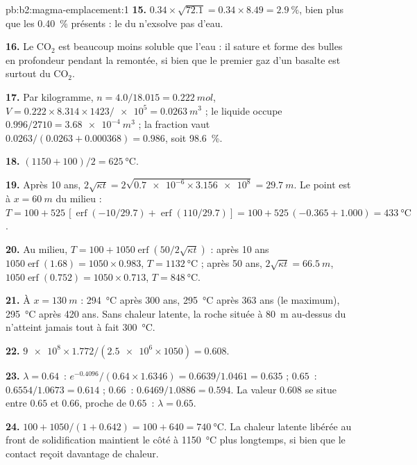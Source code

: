 \begin{solution}{pb:b2:magma-emplacement:1}
\textbf{15.} $0.34\times\sqrt{72.1} = 0.34\times8.49 = \qty{2.9}{\percent}$, bien plus que
les \qty{0.40}{\percent} présents : le  du  n'exsolve pas d'eau.

\textbf{16.} Le CO$_2$ est beaucoup moins soluble que l'eau : il sature et forme des bulles
en profondeur pendant la remontée, si bien que le premier gaz d'un basalte est surtout du CO$_2$.

\textbf{17.} Par kilogramme, $n = 4.0/18.015 = \qty{0.222}{mol}$, $V = 0.222\times8.314\times1423/
\num{e5} = \qty{0.0263}{m^3}$ ; le liquide occupe $0.996/2710 = \qty{3.68e-4}{m^3}$ ; la
fraction vaut $0.0263/(0.0263 + 0.000368) = 0.986$, soit \qty{98.6}{\percent}.

\textbf{18.} $(1150 + 100)/2 = \qty{625}{\celsius}$.

\textbf{19.} Après 10 ans, $2\sqrt{\kappa t} = 2\sqrt{\num{0.7e-6}\times\num{3.156e8}} =
\qty{29.7}{m}$. Le point est à $x = \qty{60}{m}$ du milieu : $T = 100 +
525\,[\operatorname{erf}(-10/29.7) + \operatorname{erf}(110/29.7)] = 100 + 525\,(-0.365 +
1.000) = \qty{433}{\celsius}$.

\textbf{20.} Au milieu, $T = 100 + 1050\operatorname{erf}(50/2\sqrt{\kappa t})$ : après
10 ans $1050\operatorname{erf}(1.68) = 1050\times0.983$, $T = \qty{1132}{\celsius}$ ; après
50 ans, $2\sqrt{\kappa t} = \qty{66.5}{m}$, $1050\operatorname{erf}(0.752) = 1050\times0.713$,
$T = \qty{848}{\celsius}$.

\textbf{21.} À $x = \qty{130}{m}$ : \qty{294}{\celsius} après 300 ans,
\qty{295}{\celsius} après 363 ans (le maximum), \qty{295}{\celsius} après 420
ans. Sans chaleur latente, la roche située à \qty{80}{m} au-dessus du  n'atteint jamais
tout à fait \qty{300}{\celsius}.

\textbf{22.} $\num{9e8}\times1.772/(\num{2.5e6}\times1050) = 0.608$.

\textbf{23.} $\lambda = 0.64$~: $e^{-0.4096}/(0.64\times1.6346) = 0.6639/1.0461 = 0.635$ ;
$0.65$~: $0.6554/1.0673 = 0.614$ ; $0.66$~: $0.6469/1.0886 = 0.594$. La valeur $0.608$
se situe entre $0.65$ et $0.66$, proche de $0.65$~: $\lambda = 0.65$.

\textbf{24.} $100 + 1050/(1 + 0.642) = 100 + 640 = \qty{740}{\celsius}$. La chaleur latente
libérée au front de solidification maintient le côté  à
\qty{1150}{\celsius} plus longtemps, si bien que le contact reçoit davantage de chaleur.


\end{solution}
